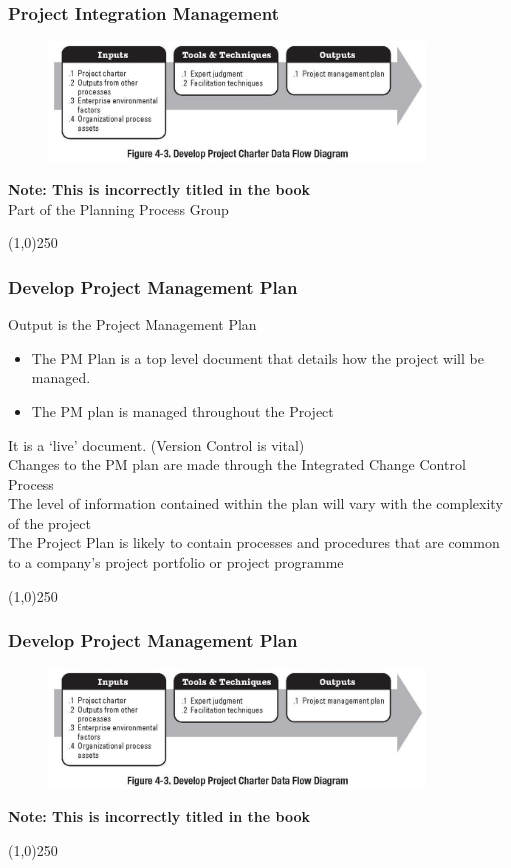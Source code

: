 \begin{frame}
\frametitle{Project Integration Management} 
\begin{figure}
 	\centering
 		\includegraphics[width = 10cm]{images/Fig4-3.jpg}
 	\label{fig:4-3}
 \end{figure}
 \textbf{Note: This is incorrectly titled in the book}\\
Part of the Planning Process Group
\end{frame}\begin{center}\line(1,0){250}\end{center}
%
%

\begin{frame}
\frametitle{Develop Project Management Plan}
Output is the Project Management Plan
\begin{itemize}
	\item The PM Plan is a top level document that details how the project will be managed.
	\item The PM plan is managed throughout the Project
\end{itemize}
It is a `live' document.  (Version Control is vital)\\
Changes to the PM plan are made through the Integrated Change Control Process\\
The level of information contained within the plan will vary with the complexity of the project\\
The Project Plan is likely to contain processes and procedures that are common to a company's project portfolio or project programme\\
\end{frame}\begin{center}\line(1,0){250}\end{center}
%
%

\begin{frame}
\frametitle{Develop Project Management Plan}
\begin{figure}
	\centering
		\includegraphics[width = 10cm]{images/fig4-3.jpg}
	\label{fig:4-3}
\end{figure}
\textbf{Note: This is incorrectly titled in the book}
\end{frame}\begin{center}\line(1,0){250}\end{center}
%
%

